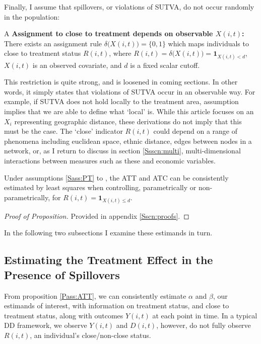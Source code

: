 Finally, I assume that spillovers, or violations of SUTVA, do not occur randomly
in the population:
\begin{assumption}{4}{A}
\label{Sass:SUTVAl}
\textbf{Assignment to close to treatment depends on observable $X(i,t)$:} \\ 
There exists an assignment rule $\delta\Big(X(i,t)\Big)=\{0,1\}$ which maps 
individuals to close to treatment status $R(i,t)$, where $R(i,t)=\delta
\Big(X(i,t)\Big)=\mathbf{1}_{X(i,t)<d}$, $X(i,t)$ is an observed covariate, and 
$d$ is a fixed scalar cutoff. 
\end{assumption}
\vspace{-4mm}
\noindent This restriction is quite strong, and is loosened in coming sections.  
In other words, it simply states 
that violations of SUTVA occur in an observable way.  For example, if SUTVA does
not hold locally to the treatment area, assumption  implies
that we are able to define what `local' is.  While this article focuses on
an $X_i$ representing geographic distance, these derivations do not imply that 
this must be the case.  The `close' indicator $R(i,t)$ could depend on a range 
of phenomena including euclidean space, ethnic distance, edges between
nodes in a network, or, as I return to discuss in section \ref{Ssscn:multi}, 
multi-dimensional interactions between measures such as these and economic 
variables. 
\begin{proposition}
\label{Pass:ATT}
Under assumptions \ref{Sass:PT} to , the ATT and ATC can be 
consistently estimated by least squares when controlling, parametrically or
non-parametrically, for $R(i,t)=\mathbf{1}_{X(i,t)\leq d}$.
\end{proposition}
\renewcommand{\qedsymbol}{$\blacksquare$}
\begin{proof}[Proof of Proposition]
Provided in appendix \ref{Sscn:proofs}.
\end{proof}
\noindent In the following two subsections I examine these estimands in turn. 

\subsection{Estimating the Treatment Effect in the Presence of Spillovers}
\label{Ssscn:TE}
From proposition \ref{Pass:ATT}, we can consistently estimate $\alpha$ and 
$\beta$, our estimands of interest, with information on treatment status, and 
close to treatment status, along with outcomes $Y(i,t)$ at each point in time. In 
a typical DD framework, we observe $Y(i,t)$ and $D(i,t)$, however, do not fully 
observe $R(i,t)$, an individual's close/non-close status.

